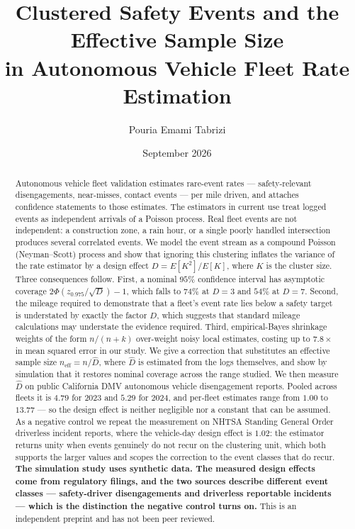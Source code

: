 \documentclass[11pt]{article}
\title{\bfseries Clustered Safety Events and the Effective Sample Size\\
in Autonomous Vehicle Fleet Rate Estimation}
\author{Pouria Emami Tabrizi}
\date{September 2026}
\begin{document}
\maketitle

\begin{abstract}
Autonomous vehicle fleet validation estimates rare-event rates --- safety-relevant
disengagements, near-misses, contact events --- per mile driven, and attaches
confidence statements to those estimates. The estimators in current use treat
logged events as independent arrivals of a Poisson process. Real fleet events are
not independent: a construction zone, a rain hour, or a single poorly handled
intersection produces several correlated events. We model the event stream as a
compound Poisson (Neyman--Scott) process and show that ignoring this clustering
inflates the variance of the rate estimator by a design effect
$D = E[K^2]/E[K]$, where $K$ is the cluster size. Three consequences follow. First,
a nominal $95\%$ confidence interval has asymptotic coverage
$2\Phi(z_{0.975}/\sqrt{D}) - 1$, which falls to $74\%$ at $D=3$ and $54\%$ at
$D=7$. Second, the mileage required to demonstrate that a fleet's event rate lies
below a safety target is understated by exactly the factor $D$, which suggests
that standard mileage calculations may understate the evidence required. Third,
empirical-Bayes shrinkage weights of the form $n/(n+k)$ over-weight noisy local
estimates, costing up to $7.8\times$ in mean squared error in our study. We give
a correction that substitutes an effective sample size $n_{\text{eff}} = n/\hat{D}$,
where $\hat{D}$ is estimated from the logs themselves, and show by simulation
that it restores nominal coverage across the range studied. We then measure
$\hat{D}$ on public California DMV autonomous vehicle disengagement reports.
Pooled across fleets it is $4.79$ for 2023 and $5.29$ for 2024, and per-fleet
estimates range from $1.00$ to $13.77$ --- so the design effect is neither
negligible nor a constant that can be assumed. As a negative control we repeat
the measurement on NHTSA Standing General Order driverless incident reports,
where the vehicle-day design effect is $1.02$: the estimator returns unity when
events genuinely do not recur on the clustering unit, which both supports the
larger values and scopes the correction to the event classes that do recur.
\textbf{The simulation study uses synthetic data. The measured design effects
come from regulatory filings, and the two sources describe different event
classes --- safety-driver disengagements and driverless reportable incidents ---
which is the distinction the negative control turns on.} This is an independent
preprint and has not been peer reviewed.
\end{abstract}
\end{document}

